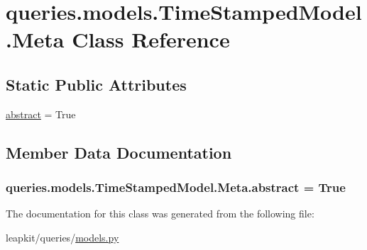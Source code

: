 \hypertarget{classqueries_1_1models_1_1_time_stamped_model_1_1_meta}{\section{queries.\-models.\-Time\-Stamped\-Model.\-Meta Class Reference}
\label{classqueries_1_1models_1_1_time_stamped_model_1_1_meta}
}
\subsection*{Static Public Attributes}
\begin{DoxyCompactItemize}
\item 
\hyperlink{classqueries_1_1models_1_1_time_stamped_model_1_1_meta_a2718a79b023141d59117cc780de3ea8d}{abstract} = True
\end{DoxyCompactItemize}


\subsection{Member Data Documentation}
\hypertarget{classqueries_1_1models_1_1_time_stamped_model_1_1_meta_a2718a79b023141d59117cc780de3ea8d}{
\subsubsection[{abstract}]{\setlength{\rightskip}{0pt plus 5cm}queries.\-models.\-Time\-Stamped\-Model.\-Meta.\-abstract = True\hspace{0.3cm}{\ttfamily [static]}}}\label{classqueries_1_1models_1_1_time_stamped_model_1_1_meta_a2718a79b023141d59117cc780de3ea8d}


The documentation for this class was generated from the following file\-:\begin{DoxyCompactItemize}
\item 
leapkit/queries/\hyperlink{queries_2models_8py}{models.\-py}\end{DoxyCompactItemize}
